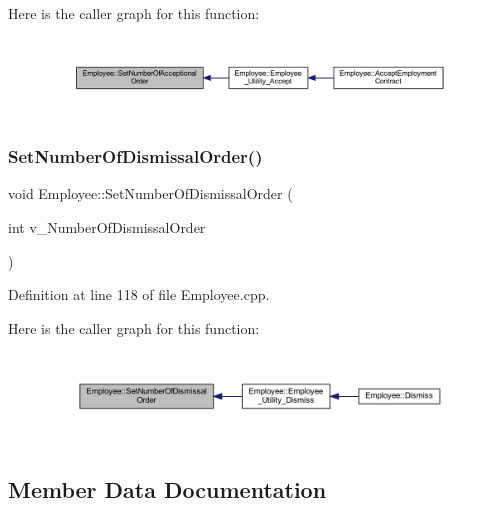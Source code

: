 Here is the caller graph for this function\+:
\nopagebreak
\begin{figure}[H]
\begin{center}
\leavevmode
\includegraphics[width=350pt]{class_employee_ae0a2d5a5ec36af567bc7e434d18de422_icgraph}
\end{center}
\end{figure}
\mbox{\label{class_employee_abcf46d071f43b17f0a83b00a327822b9}} 
\subsubsection{\texorpdfstring{Set\+Number\+Of\+Dismissal\+Order()}{SetNumberOfDismissalOrder()}}
{\footnotesize\ttfamily void Employee\+::\+Set\+Number\+Of\+Dismissal\+Order (\begin{DoxyParamCaption}\item[{int}]{v\+\_\+\+Number\+Of\+Dismissal\+Order }\end{DoxyParamCaption})}



Definition at line 118 of file Employee.\+cpp.

Here is the caller graph for this function\+:
\nopagebreak
\begin{figure}[H]
\begin{center}
\leavevmode
\includegraphics[width=350pt]{class_employee_abcf46d071f43b17f0a83b00a327822b9_icgraph}
\end{center}
\end{figure}


\subsection{Member Data Documentation}
\mbox{\label{class_employee_ae218a1ea5ff298c3501afa8e815da9d7}} 

